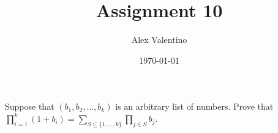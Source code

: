 \documentclass[12pt, letterpaper]{article}
\date{\today}
\author{Alex Valentino}
\title{Assignment 10}
\newcommand{\Po}{\mathcal{P}}
\begin{document}
Suppose that $(b_1,b_2,\ldots,b_k)$ is an arbitrary list of numbers.
Prove that $\prod_{i=1}^k (1+b_i)=\sum_{S \subseteq \{1,\ldots,k\}} \prod_{j \in S} b_j$.\\
\iffalse
Lemma: We must show that for all non-empty sets $A$ for any $a\in A$ that $\Po(A) = \Po(A\backslash a)\cup (\{a\} \cup \Po(A\backslash a))$.
Suppose $A$ is an arbitrary non-empty set, and $a$ is an arbitrary element in $A$.  We must show $\Po(A) = \Po(A\backslash a)\cup (\{a\} \cup \Po(A\backslash a))$.  Therefore we must prove $\Po(A) \subseteq \Po(A\backslash a)\cup (\{a\} \cup \Po(A\backslash \{a\}))$ and $\Po(A\backslash a)\cup (\{a\} \cup \Po(A\backslash \{a\})) \subseteq \Po(A).$
\begin{itemize}
	\item We must show $\Po(A) \subseteq \Po(A\backslash \{a\})\cup (\{a\} \cup \Po(A\backslash a))$.  Suppose $X \in \Po(A), X \not\in \Po(A\backslash \{a\}).$ Then we must show $X \in (\{a\} \cup \Po(A\backslash a)).$  Since $X \in \Po(A), X \not\in \Po(A\backslash \{a\})$ then by definition of the power set $X \subseteq A, X \nsubseteq A \backslash \{a\}.$  Therefore since the only difference between $A$ and $A \backslash \{a\}$ is $\{a\}$ then $a \in X.$  Since $X \subseteq A,$ then $X \backslash \{a\} \subseteq A \backslash \{a\}.$  Therefore $X \backslash \{a\} \in \Po(A\backslash \{a\}).$  Therefore adding $\{a\}$ to both sides yields $X \in \{a\} \cup \Po(A\backslash \{a\}).$
	\item We must show $\Po(A\backslash \{a\})\cup (\{a\} \cup \Po(A\backslash \{a\})) \subseteq \Po(A).$  \begin{itemize}
		\item Suppose $X \in \Po(A\backslash \{a\}).$  We must show $X \in \Po(A).$  Since $X \in \Po(A\backslash \{a\})$ by definition $X \subseteq A\backslash \{a\}.$  Since $A \backslash \{a\} \subseteq A,$ then $X \subset A.$
		\item Suppose $X \in \{a\} \cup \Po(A\backslash \{a\}).$  Since $\{a\} \subseteq A,$ and $ A\backslash \{a\} \subseteq A,$ then  $\{a\} \cup \Po(A\backslash \{a\}) \subset A.$  
	\end{itemize}
\end{itemize}
\fi
\end{document}
